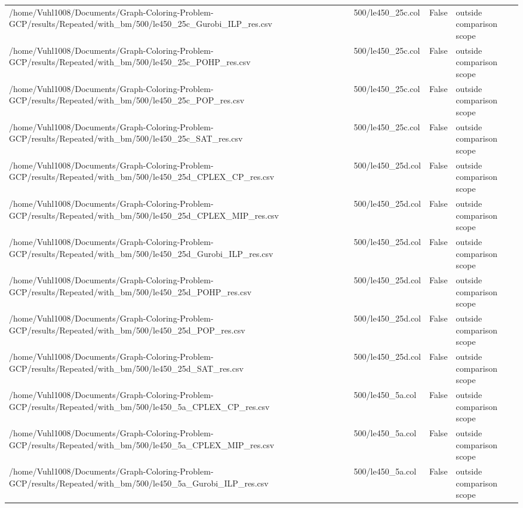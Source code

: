 \begin{table}[htbp]
\begin{tabular}{llll}
/home/Vuhl1008/Documents/Graph-Coloring-Problem-GCP/results/Repeated/with\_bm/500/le450\_25c\_Gurobi\_ILP\_res.csv & 500/le450\_25c.col & False & outside comparison scope \\
/home/Vuhl1008/Documents/Graph-Coloring-Problem-GCP/results/Repeated/with\_bm/500/le450\_25c\_POHP\_res.csv & 500/le450\_25c.col & False & outside comparison scope \\
/home/Vuhl1008/Documents/Graph-Coloring-Problem-GCP/results/Repeated/with\_bm/500/le450\_25c\_POP\_res.csv & 500/le450\_25c.col & False & outside comparison scope \\
/home/Vuhl1008/Documents/Graph-Coloring-Problem-GCP/results/Repeated/with\_bm/500/le450\_25c\_SAT\_res.csv & 500/le450\_25c.col & False & outside comparison scope \\
/home/Vuhl1008/Documents/Graph-Coloring-Problem-GCP/results/Repeated/with\_bm/500/le450\_25d\_CPLEX\_CP\_res.csv & 500/le450\_25d.col & False & outside comparison scope \\
/home/Vuhl1008/Documents/Graph-Coloring-Problem-GCP/results/Repeated/with\_bm/500/le450\_25d\_CPLEX\_MIP\_res.csv & 500/le450\_25d.col & False & outside comparison scope \\
/home/Vuhl1008/Documents/Graph-Coloring-Problem-GCP/results/Repeated/with\_bm/500/le450\_25d\_Gurobi\_ILP\_res.csv & 500/le450\_25d.col & False & outside comparison scope \\
/home/Vuhl1008/Documents/Graph-Coloring-Problem-GCP/results/Repeated/with\_bm/500/le450\_25d\_POHP\_res.csv & 500/le450\_25d.col & False & outside comparison scope \\
/home/Vuhl1008/Documents/Graph-Coloring-Problem-GCP/results/Repeated/with\_bm/500/le450\_25d\_POP\_res.csv & 500/le450\_25d.col & False & outside comparison scope \\
/home/Vuhl1008/Documents/Graph-Coloring-Problem-GCP/results/Repeated/with\_bm/500/le450\_25d\_SAT\_res.csv & 500/le450\_25d.col & False & outside comparison scope \\
/home/Vuhl1008/Documents/Graph-Coloring-Problem-GCP/results/Repeated/with\_bm/500/le450\_5a\_CPLEX\_CP\_res.csv & 500/le450\_5a.col & False & outside comparison scope \\
/home/Vuhl1008/Documents/Graph-Coloring-Problem-GCP/results/Repeated/with\_bm/500/le450\_5a\_CPLEX\_MIP\_res.csv & 500/le450\_5a.col & False & outside comparison scope \\
/home/Vuhl1008/Documents/Graph-Coloring-Problem-GCP/results/Repeated/with\_bm/500/le450\_5a\_Gurobi\_ILP\_res.csv & 500/le450\_5a.col & False & outside comparison scope \\

\end{tabular}
\end{table}
